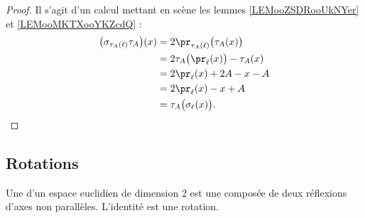 \begin{proof}
	Il s'agit d'un calcul mettant en scène les lemmes \ref{LEMooZSDRooUkNYer} et \ref{LEMooMKTXooYKZcdQ} :
	\begin{subequations}
		\begin{align}
			\big( \sigma_{\tau_A(\ell)}\tau_A \big)(x) & =2\pr_{\tau_A(\ell)}\big( \tau_A(x) \big)   \\
			                                           & =2\tau_A\big( \pr_{\ell}(x) \big)-\tau_A(x) \\
			                                           & =2\pr_{\ell}(x)+2A-x-A                      \\
			                                           & =2\pr_{\ell}(x)-x+A                         \\
			                                           & =\tau_A\big( \sigma_{\ell}(x) \big).
		\end{align}
	\end{subequations}
\end{proof}

\subsection{Rotations}

\begin{definition}        \label{DEFooFUBYooHGXphm}
	Une  d'un espace euclidien de dimension \( 2\) est une composée de deux réflexions d'axes non parallèles. L'identité est une rotation.
\end{definition}

